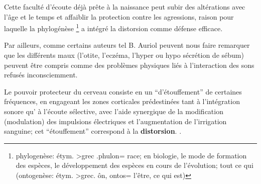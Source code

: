 Cette faculté d'écoute déjà prête à la naissance peut subir des
altérations avec l'âge et
le temps et affaiblir la protection contre les agressions, raison pour
laquelle la phylogénèse \footnote{ phylogenèse: étym. >grec .phulon=
  race; en biologie, le mode de formation des espèces, le développement
  des espèces en cours de l'évolution; tout ce qui (ontogenèse: étym. >grec. ôn, ontos= l'être,
ce qui est)}  a intégré la distorsion comme défense
efficace.

Par ailleurs, comme certains auteurs tel B. Auriol peuvent nous faire
remarquer que 
les différents maux (l'otite, l'eczéma, l'hyper
ou hypo sécrétion de sébum) peuvent être compris comme des problèmes physiques liés à l'interaction des sons refusés
inconsciemment.  \autocite  [19--20] {auriol:cle}

Le pouvoir protecteur du cerveau consiste en un  ``d'étouffement'' de
certaines fréquences,  en engageant les zones corticales prédestinées
tant à 
l'intégration sonore qu' à l'écoute sélective,  avec l'aide synergique de la
modification (modulation) des impulsions électriques et l'augmentation de
l'irrigation sanguine\autocite [14] {auriol:cle}; 
cet ``étouffement'' correspond à la
\textbf{distorsion}.
\autocite{tomatis:education}.

  




  




 




  

